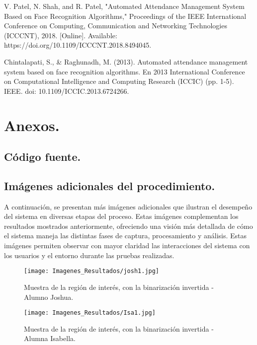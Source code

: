 \documentclass[12pt, letterpaper]{article}
\begin{document}
\begin{thebibliography}{00}
 V. Patel, N. Shah, and R. Patel, "Automated Attendance Management System Based on Face Recognition Algorithms," Proceedings of the IEEE International Conference on Computing, Communication and Networking Technologies (ICCCNT), 2018. [Online]. Available: https://doi.org/10.1109/ICCCNT.2018.8494045.

 Chintalapati, S., & Raghunadh, M. (2013). Automated attendance management system based on face recognition algorithms. En 2013 International Conference on Computational Intelligence and Computing Research (ICCIC) (pp. 1-5). IEEE. doi: 10.1109/ICCIC.2013.6724266.

\end{thebibliography}


\section{Anexos.}
\subsection{Código fuente.}


\FloatBarrier

\subsection{Imágenes adicionales del procedimiento.}
A continuación, se presentan más imágenes adicionales que ilustran el desempeño del sistema en diversas etapas del proceso. Estas imágenes complementan los resultados mostrados anteriormente, ofreciendo una visión más detallada de cómo el sistema maneja las distintas fases de captura, procesamiento y análisis. Estas imágenes permiten observar con mayor claridad las interacciones del sistema con los usuarios y el entorno durante las pruebas realizadas.

\begin{figure}[H]
    \centering
    \texttt{[image: Imagenes\_Resultados/josh1.jpg]} 
    \caption{Muestra de la región de interés, con la binarización invertida - Alumno Joshua.}
    \label{fig:etiqueta}
\end{figure}

\begin{figure}[H]
    \centering
    \texttt{[image: Imagenes\_Resultados/Isa1.jpg]} 
    \caption{Muestra de la región de interés, con la binarización invertida - Alumna Isabella.}
    \label{fig:etiqueta}
\end{figure}
\end{document}
